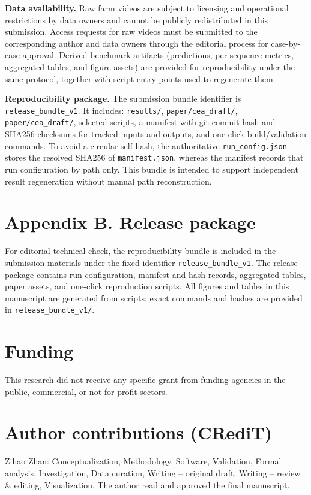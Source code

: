 \documentclass[5p,twocolumn,a4paper]{elsarticle}
\begin{document}
\textbf{Data availability.} Raw farm videos are subject to licensing and operational restrictions by data owners and cannot be publicly redistributed in this submission. Access requests for raw videos must be submitted to the corresponding author and data owners through the editorial process for case-by-case approval. Derived benchmark artifacts (predictions, per-sequence metrics, aggregated tables, and figure assets) are provided for reproducibility under the same protocol, together with script entry points used to regenerate them.

\textbf{Reproducibility package.} The submission bundle identifier is \texttt{release\_bundle\_v1}. It includes: \texttt{results/}, \texttt{paper/cea\_draft/}, \texttt{paper/cea\_draft/}, selected scripts, a manifest with git commit hash and SHA256 checksums for tracked inputs and outputs, and one-click build/validation commands. To avoid a circular self-hash, the authoritative \texttt{run\_config.json} stores the resolved SHA256 of \texttt{manifest.json}, whereas the manifest records that run configuration by path only. This bundle is intended to support independent result regeneration without manual path reconstruction.

\section*{Appendix B. Release package}
For editorial technical check, the reproducibility bundle is included in the submission materials under the fixed identifier \texttt{release\_bundle\_v1}.
The release package contains run configuration, manifest and hash records, aggregated tables, paper assets, and one-click reproduction scripts.
All figures and tables in this manuscript are generated from scripts; exact commands and hashes are provided in \texttt{release\_bundle\_v1/}.

\section*{Funding}
This research did not receive any specific grant from funding agencies in the public, commercial, or not-for-profit sectors.

\section*{Author contributions (CRediT)}
Zihao Zhan: Conceptualization, Methodology, Software, Validation, Formal analysis, Investigation, Data curation, Writing -- original draft, Writing -- review \& editing, Visualization. The author read and approved the final manuscript.
\end{document}
